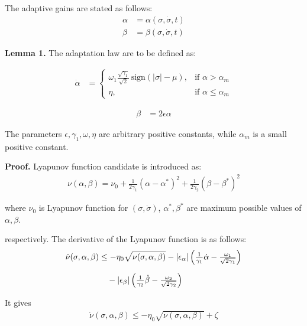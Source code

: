 \begin{small}
\begin{enumerate}
The adaptive gains are stated as follows:
\begin{align}
\alpha &= \alpha(\sigma, \dot{\sigma}, t) 
\label{4.24} \\[6pt]
\beta &= \beta(\sigma, \dot{\sigma}, t) \label{4.25}
\end{align}

\textbf{Lemma 1.} The adaptation law are to be defined as:

\begin{align}
\dot{\alpha} &=
\begin{cases}
\omega_1 \tfrac{\sqrt{\gamma_1}}{\sqrt{2}} \, \text{sign}(|\sigma|-\mu), & \text{if } \alpha > \alpha_m \\[6pt]
\eta, & \text{if } \alpha \leq \alpha_m
\end{cases} \label{4.26}
\end{align}

\begin{align*}
\beta &= 2 \epsilon \alpha
\end{align*}



The parameters $\epsilon, \gamma_1, \omega, \eta$ are arbitrary positive constants, 
while $\alpha_m$ is a small positive constant.  

\noindent \textbf{Proof.} Lyapunov function candidate is introduced as:
\begin{align}
\nu(\alpha,\beta) = \nu_0 + \tfrac{1}{2\gamma_1}(\alpha-\alpha^*)^2 + \tfrac{1}{2\gamma_2}(\beta-\beta^*)^2 \label{4.27}
\end{align}

where $\nu_0$ is Lyapunov function for $(\sigma,\dot{\sigma})$, 
$\alpha^*, \beta^*$ are maximum possible values of $\alpha, \beta$.



respectively. The derivative of the Lyapunov function is as follows:
\begin{align}
\dot{\nu}(\sigma,\alpha,\beta) &\leq -\eta_0 \sqrt{\nu(\sigma,\alpha,\beta)} 
- |\epsilon_\alpha|\left(\tfrac{1}{\gamma_1}\dot{\alpha} - \tfrac{\omega_1}{\sqrt{2\gamma_1}}\right) \notag \\[6pt]
&\quad - |\epsilon_\beta|\left(\tfrac{1}{\gamma_2}\dot{\beta} - \tfrac{\omega_2}{\sqrt{2\gamma_2}}\right) \label{4.28}
\end{align}

It gives
\begin{align}
\dot{\nu}(\sigma,\alpha,\beta) \leq -\eta_0 \sqrt{\nu(\sigma,\alpha,\beta)} + \zeta \label{4.29}
\end{align}


\end{enumerate}
\end{small}
